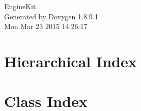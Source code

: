 \documentclass[twoside]{book}
\newcommand{\+}{\discretionary{\mbox{\scriptsize$\hookleftarrow$}}{}{}}
\newcommand{\clearemptydoublepage}{%
  \newpage{\pagestyle{empty}\cleardoublepage}%
}
\begin{document}
\hypersetup{pageanchor=false,
             bookmarks=true,
             bookmarksnumbered=true,
             pdfencoding=unicode
            }
\begin{titlepage}
\vspace*{7cm}
\begin{center}%
{\Large Engine\+Kit }\\
\vspace*{1cm}
{\large Generated by Doxygen 1.8.9.1}\\
\vspace*{0.5cm}
{\small Mon Mar 23 2015 14:26:17}\\
\end{center}
\end{titlepage}
\clearemptydoublepage
\tableofcontents
\clearemptydoublepage
{}
\hypersetup{pageanchor=true}

\chapter{Hierarchical Index}

\chapter{Class Index}

\end{document}
